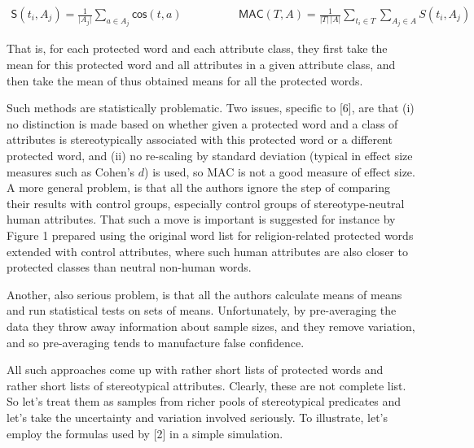 \documentclass[12pt,dvipsnames,enabledeprecatedfontcommands]{scrartcl}
\begin{document}
\vspace{-2mm}

\footnotesize

\begin{align}
\mathsf{S}(t_i, A_j)  = \frac{1}{\vert A_j\vert}\sum_{a\in A_j}\mathsf{cos}(t,a) & \,\,\,\,\,\,\,\,\,\,\,\,\,\,\,\,\,\,\,\,\,\,\,\,\,
\mathsf{MAC}(T,A)  = \frac{1}{\vert T \vert \,\vert A\vert}\sum_{t_i \in T }\sum_{A_j \in A} S(t_i,A_j) \tag{MAC}
\end{align}

\normalsize  \noindent That is, for each protected word and each
attribute class, they first take the mean for this protected word and
all attributes in a given attribute class, and then take the mean of
thus obtained means for all the protected words.

Such methods are statistically problematic. Two issues, specific to
{[}6{]}, are that (i) no distinction is made based on whether given a
protected word and a class of attributes is stereotypically associated
with this protected word or a different protected word, and (ii) no
re-scaling by standard deviation (typical in effect size measures such
as Cohen's \(d\)) is used, so MAC is not a good measure of effect size.
A more general problem, is that all the authors ignore the step of
comparing their results with control groups, especially control groups
of stereotype-neutral human attributes. That such a move is important is
suggested for instance by Figure 1 prepared using the original word list
for religion-related protected words extended with control attributes,
where such human attributes are also closer to protected classes than
neutral non-human words.

Another, also serious problem, is that all the authors calculate means
of means and run statistical tests on sets of means. Unfortunately, by
pre-averaging the data they throw away information about sample sizes,
and they remove variation, and so pre-averaging tends to manufacture
false confidence.

All such approaches come up with rather short lists of protected words
and rather short lists of stereotypical attributes. Clearly, these are
not complete list. So let's treat them as samples from richer pools of
stereotypical predicates and let's take the uncertainty and variation
involved seriously. To illustrate, let's employ the formulas used by
{[}2{]} in a simple simulation.

\noindent
\end{document}

